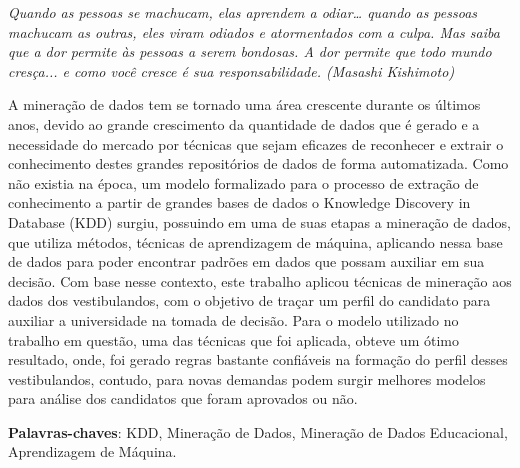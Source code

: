 \documentclass[
	12pt,				%
    oneside,			%
	a4paper,			%
	chapter=TITLE,		%
	english,			%
	brazil				%
	]{abntex2}
\begin{document}
\begin{epigrafe}
    \vspace*{\fill}
	\begin{flushright}
		\textit{Quando as pessoas se machucam, elas aprendem a odiar… quando as pessoas machucam as outras, eles viram odiados e atormentados com a culpa. Mas saiba que a dor permite às pessoas a serem bondosas. A dor permite que todo mundo cresça... e como você cresce é sua responsabilidade. (Masashi Kishimoto)}
	\end{flushright}
\end{epigrafe}


\setlength{\absparsep}{18pt} %
\begin{resumo}
    A mineração de dados tem se tornado uma área crescente durante os últimos anos, devido ao grande crescimento da quantidade de dados que é gerado e a necessidade do mercado por técnicas que sejam eficazes de reconhecer e extrair o conhecimento destes grandes repositórios de dados de forma automatizada. Como não existia na época, um modelo formalizado para o processo de extração de conhecimento a partir de grandes bases de dados o Knowledge Discovery in Database (KDD) surgiu, possuindo em uma de suas etapas a mineração de dados, que utiliza métodos, técnicas de aprendizagem de máquina, aplicando nessa base de dados para poder encontrar padrões em dados que possam auxiliar em sua decisão. Com base nesse contexto, este trabalho aplicou técnicas de mineração aos dados dos vestibulandos, com o objetivo de traçar um perfil do candidato para auxiliar a universidade na tomada de decisão. Para o modelo utilizado no trabalho em questão, uma das técnicas que foi aplicada, obteve um ótimo resultado, onde, foi gerado regras bastante confiáveis na formação do perfil desses vestibulandos, contudo, para novas demandas podem surgir melhores modelos para análise dos candidatos que foram aprovados ou não.

 \vspace{\onelineskip}
 
 \noindent 
 \textbf{Palavras-chaves}: KDD, Mineração de Dados, Mineração de Dados Educacional, Aprendizagem de Máquina.
\end{resumo}
\end{document}
